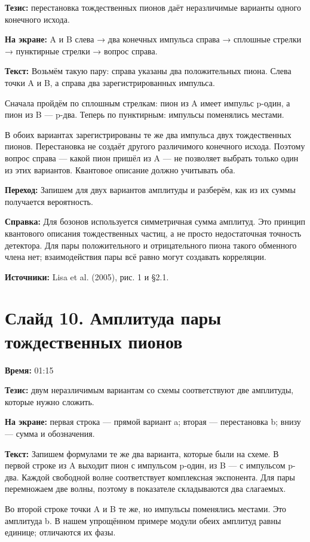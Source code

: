 \documentclass[11pt,a4paper]{article}
\begin{document}
\textbf{Тезис:} перестановка тождественных пионов даёт неразличимые варианты одного конечного исхода.

\textbf{На экране:} A и B слева → два конечных импульса справа → сплошные стрелки → пунктирные стрелки → вопрос справа.

\textbf{Текст:} Возьмём такую пару: справа указаны два положительных пиона. Слева точки A и B, а справа два зарегистрированных импульса.

Сначала пройдём по сплошным стрелкам: пион из A имеет импульс p-один, а пион из B — p-два. Теперь по пунктирным: импульсы поменялись местами.

В обоих вариантах зарегистрированы те же два импульса двух тождественных пионов. Перестановка не создаёт другого различимого конечного исхода. Поэтому вопрос справа — какой пион пришёл из A — не позволяет выбрать только один из этих вариантов. Квантовое описание должно учитывать оба.

\textbf{Переход:} Запишем для двух вариантов амплитуды и разберём, как из их суммы получается вероятность.

\textbf{Справка:} Для бозонов используется симметричная сумма амплитуд. Это принцип квантового описания тождественных частиц, а не просто недостаточная точность детектора. Для пары положительного и отрицательного пиона такого обменного члена нет; взаимодействия пары всё равно могут создавать корреляции.

\textbf{Источники:} Lisa et al. (2005), рис. 1 и §2.1.

\clearpage
\section*{Слайд 10. Амплитуда пары тождественных пионов}
\textbf{Время:} 01:15

\textbf{Тезис:} двум неразличимым вариантам со схемы соответствуют две амплитуды, которые нужно сложить.

\textbf{На экране:} первая строка — прямой вариант a; вторая — перестановка b; внизу — сумма и обозначения.

\textbf{Текст:} Запишем формулами те же два варианта, которые были на схеме. В первой строке из A выходит пион с импульсом p-один, из B — с импульсом p-два. Каждой свободной волне соответствует комплексная экспонента. Для пары перемножаем две волны, поэтому в показателе складываются два слагаемых.

Во второй строке точки A и B те же, но импульсы поменялись местами. Это амплитуда b. В нашем упрощённом примере модули обеих амплитуд равны единице; отличаются их фазы.
\end{document}
